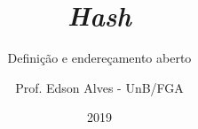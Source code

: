 \title{\textit{Hash}}
\subtitle{Definição e endereçamento aberto}
\author{Prof. Edson Alves - UnB/FGA}
\date{2019}
